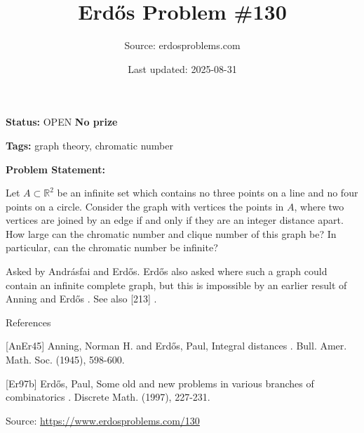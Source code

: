 \documentclass{article}
\title{Erd\H{o}s Problem \#130}
\date{Last updated: 2025-08-31}
\author{Source: erdosproblems.com}
\begin{document}
\maketitle

\noindent\textbf{Status:} OPEN \quad \textbf{No prize}

\noindent\textbf{Tags:} graph theory, chromatic number

\medskip

\noindent\textbf{Problem Statement:}

Let $A\subset\mathbb{R}^2$ be an infinite set which contains no three points on a line and no four points on a circle. Consider the graph with vertices the points in $A$, where two vertices are joined by an edge if and only if they are an integer distance apart. How large can the chromatic number and clique number of this graph be? In particular, can the chromatic number be infinite?




Asked by Andr\'{a}sfai and Erd\H{o}s. Erd\H{o}s \cite{Er97b} also asked where such a graph could contain an infinite complete graph, but this is impossible by an earlier result of Anning and Erd\H{o}s \cite{AnEr45}. See also [213] .




References

[AnEr45] Anning, Norman H. and Erd\H{o}s, Paul, Integral distances . Bull. Amer. Math. Soc. (1945), 598-600.

[Er97b] Erd\H{o}s, Paul, Some old and new problems in various branches of combinatorics . Discrete Math. (1997), 227-231.


\bigskip
\noindent\small{Source: \url{https://www.erdosproblems.com/130}}
\end{document}
